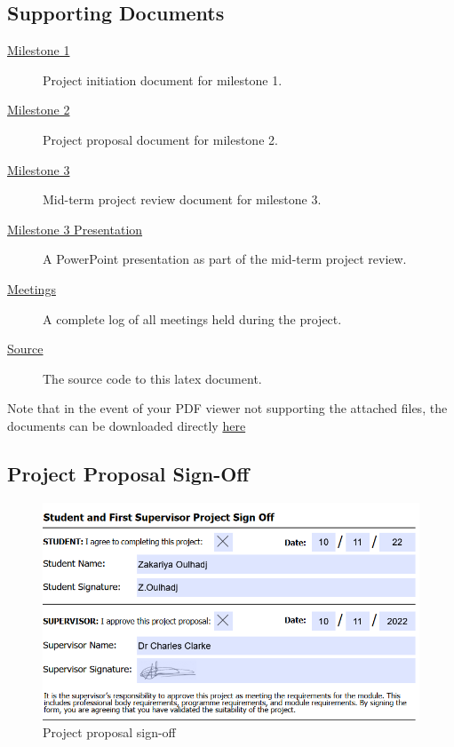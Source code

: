 \documentclass[11pt]{article}
\begin{document}
\subsection{Supporting Documents} \label{supporting_documents}


\begin{description}
  \item[\href{gotoe:embedded=attached_documents/milestone_1.pdf}{Milestone 1}]
    Project initiation document for milestone 1.
  \item[\href{gotoe:embedded=attached_documents/milestone_2_signed.pdf}{Milestone 2}]
    Project proposal document for milestone 2.
  \item[\href{gotoe:embedded=attached_documents/mid_project_review.pdf}{Milestone 3}]
    Mid-term project review document for milestone 3.
  \item[\href{gotoe:embedded=attached_documents/milestone_3_4_presentation.pptx}{Milestone 3 Presentation}]
    A PowerPoint presentation as part of the mid-term project review.
  \item[\href{gotoe:embedded=attached_documents/meetings.docx}{Meetings}]
    A complete log of all meetings held during the project.
  \item[\href{gotoe:embedded=report.tex}{Source}]
    The source code to this latex document.
\end{description}

Note that in the event of your PDF viewer not supporting the attached files, the
documents can be downloaded directly
\href{https://drive.google.com/file/d/16w75WCNzETuBmHsmCkJ6aGGZjDIwFHcV/view?usp=share_link}{here}

\subsection{Project Proposal Sign-Off} \label{project_proposal}
\begin{figure}[H]
  \centering
  \includegraphics[width=\textwidth]{images/project_signoff.png}
  \caption{Project proposal sign-off}
  \label{fig:project_signoff}
\end{figure}
\end{document}
